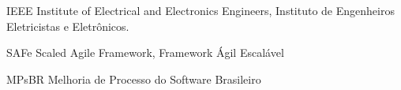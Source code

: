 \begin{siglas}
  \item[IEEE] Institute of Electrical and Electronics Engineers, Instituto de Engenheiros Eletricistas e Eletrônicos.
  \item[SAFe] Scaled Agile Framework, Framework Ágil Escalável
  \item[MPsBR] Melhoria de Processo do Software Brasileiro
\end{siglas}
